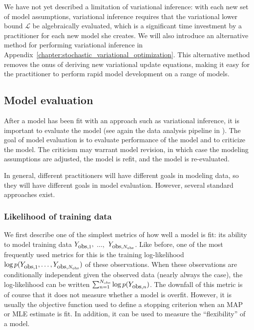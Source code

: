 We have not yet described a limitation of variational inference: with
each new set of model assumptions, variational inference requires that
the variational lower bound $\mathcal{L}$ be algebraically evaluated,
which is a significant time investment by a practitioner for each new
model she creates.  We will also introduce an alternative method for
performing variational inference in
Appendix~\ref{chapter:stochastic_variational_optimization}.  This
alternative method removes the onus of deriving new variational update
equations, making it easy for the practitioner to perform rapid model
development on a range of models.


\subsection{Model evaluation}

After a model has been fit with an approach such as variational
inference, it is important to evaluate the model (see again the data
analysis pipeline in ).  The goal of
model evaluation is to evaluate performance of the model and to
criticize the model.  The criticism may warrant model revision, in
which case the modeling assumptions are adjusted, the model is refit,
and the model is re-evaluated.

In general, different practitioners will have different goals in
modeling data, so they will have different goals in model evaluation.
However, several standard approaches exist.

\subsubsection{Likelihood of training data}
We first describe one of the simplest metrics of how well a model is
fit: its ability to model training data $Y_{\mbox{\small obs},1},$
$\ldots,$ $Y_{\mbox{\small obs},N_{\mbox{\tiny obs}}}$.  Like before,
one of the most frequently used metrics for this is the training
log-likelihood $\log p(Y_{\mbox{\small obs},1}, \ldots,
Y_{\mbox{\small obs},N_{\mbox{\tiny obs}}})$ of these
observations. When these observations are conditionally independent
given the observed data (nearly always the case), the log-likelihood
can be written $\sum_{n=1}^{N_{\mbox{\tiny obs}}} \log
p(Y_{\mbox{\small obs},n})$.  The downfall of this metric is of course
that it does not measure whether a model is overfit.  However, it is
usually the objective function used to define a stopping criterion
when an MAP or MLE estimate is fit.  In addition, it can be used to
measure the ``flexibility'' of a model.


